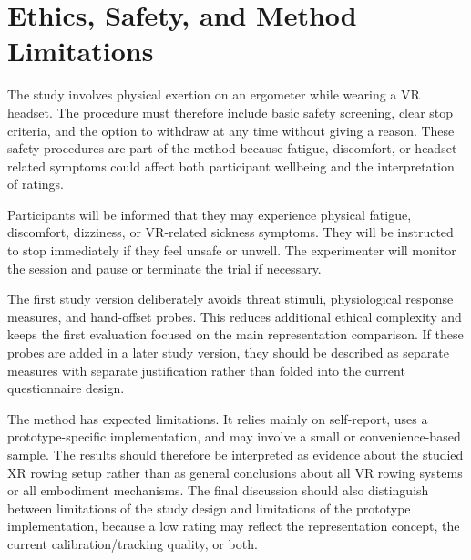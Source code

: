 \section{Ethics, Safety, and Method Limitations}
\label{sec:study_design_ethics_safety_limitations}

The study involves physical exertion on an ergometer while wearing a VR headset. The procedure must therefore include basic safety screening, clear stop criteria, and the option to withdraw at any time without giving a reason. These safety procedures are part of the method because fatigue, discomfort, or headset-related symptoms could affect both participant wellbeing and the interpretation of ratings.

Participants will be informed that they may experience physical fatigue, discomfort, dizziness, or VR-related sickness symptoms. They will be instructed to stop immediately if they feel unsafe or unwell. The experimenter will monitor the session and pause or terminate the trial if necessary.


The first study version deliberately avoids threat stimuli, physiological response measures, and hand-offset probes. This reduces additional ethical complexity and keeps the first evaluation focused on the main representation comparison. If these probes are added in a later study version, they should be described as separate measures with separate justification rather than folded into the current questionnaire design.

The method has expected limitations. It relies mainly on self-report, uses a prototype-specific implementation, and may involve a small or convenience-based sample. The results should therefore be interpreted as evidence about the studied XR rowing setup rather than as general conclusions about all VR rowing systems or all embodiment mechanisms. The final discussion should also distinguish between limitations of the study design and limitations of the prototype implementation, because a low rating may reflect the representation concept, the current calibration/tracking quality, or both.
